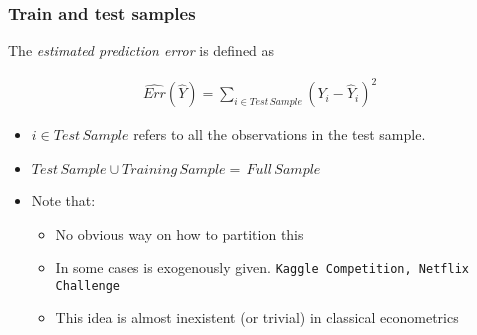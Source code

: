 \documentclass[
  shownotes,
  xcolor={svgnames},
  hyperref={colorlinks,citecolor=DarkBlue,linkcolor=DarkRed,urlcolor=DarkBlue}
  ]{beamer}
\begin{document}
\begin{frame}
\frametitle{Train and test samples}


The \emph{estimated prediction error} is defined as

\begin{align}
\hat{Err}(\hat Y) = \sum_{i \in Test\,Sample} \left(Y_i - \hat Y_i \right)^2
\end{align}

\begin{itemize}
  \item $i \in Test\,Sample$ refers to all the observations in the test sample. 
  \item $Test\,Sample \cup Training\,Sample = \,Full\,Sample$
  \bigskip
  \item Note that:
  \begin{itemize}
    \item No obvious way on how to partition this
    \item In some cases is exogenously given. \texttt{Kaggle Competition, Netflix Challenge}
    \item This idea is almost inexistent (or trivial) in classical econometrics
  \end{itemize}  

\end{itemize}




\end{frame}
\end{document}
